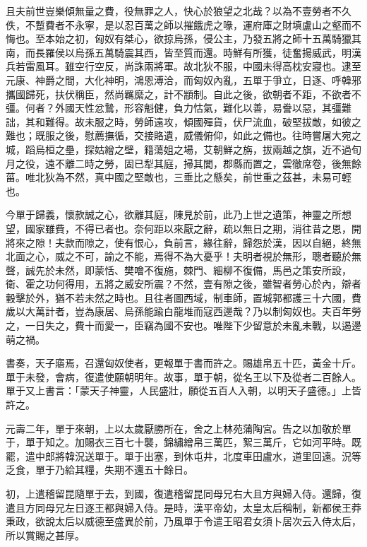 \begin{pinyinscope}
且夫前世豈樂傾無量之費，役無罪之人，快心於狼望之北哉？以為不壹勞者不久佚，不蹔費者不永寧，是以忍百萬之師以摧餓虎之喙，運府庫之財填盧山之壑而不悔也。至本始之初，匈奴有桀心，欲掠烏孫，侵公主，乃發五將之師十五萬騎獵其南，而長羅侯以烏孫五萬騎震其西，皆至質而還。時鮮有所獲，徒奮揚威武，明漢兵若雷風耳。雖空行空反，尚誅兩將軍。故北狄不服，中國未得高枕安寢也。逮至元康、神爵之間，大化神明，鴻恩溥洽，而匈奴內亂，五單于爭立，日逐、呼韓邪攜國歸死，扶伏稱臣，然尚羈縻之，計不顓制。自此之後，欲朝者不距，不欲者不彊。何者？外國天性忿鷙，形容魁健，負力怙氣，難化以善，易誊以惡，其彊難詘，其和難得。故未服之時，勞師遠攻，傾國殫貨，伏尸流血，破堅拔敵，如彼之難也；既服之後，慰薦撫循，交接賂遺，威儀俯仰，如此之備也。往時嘗屠大宛之城，蹈烏桓之壘，探姑繒之壁，籍蕩姐之場，艾朝鮮之旃，拔兩越之旗，近不過旬月之役，遠不離二時之勞，固已犁其庭，掃其閭，郡縣而置之，雲徹席卷，後無餘菑。唯北狄為不然，真中國之堅敵也，三垂比之懸矣，前世重之茲甚，未易可輕也。

今單于歸義，懷款誠之心，欲離其庭，陳見於前，此乃上世之遺策，神靈之所想望，國家雖費，不得已者也。奈何距以來厭之辭，疏以無日之期，消往昔之恩，開將來之隙！夫款而隙之，使有恨心，負前言，緣往辭，歸怨於漢，因以自絕，終無北面之心，威之不可，諭之不能，焉得不為大憂乎！夫明者視於無形，聰者聽於無聲，誠先於未然，即蒙恬、樊噲不復施，棘門、細柳不復備，馬邑之策安所設，衛、霍之功何得用，五將之威安所震？不然，壹有隙之後，雖智者勞心於內，辯者轂擊於外，猶不若未然之時也。且往者圖西域，制車師，置城郭都護三十六國，費歲以大萬計者，豈為康居、烏孫能踰白龍堆而寇西邊哉？乃以制匈奴也。夫百年勞之，一日失之，費十而愛一，臣竊為國不安也。唯陛下少留意於未亂未戰，以遏邊萌之禍。

書奏，天子寤焉，召還匈奴使者，更報單于書而許之。賜雄帛五十匹，黃金十斤。單于未發，會病，復遣使願朝明年。故事，單于朝，從名王以下及從者二百餘人。單于又上書言：「蒙天子神靈，人民盛壯，願從五百人入朝，以明天子盛德。」上皆許之。

元壽二年，單于來朝，上以太歲厭勝所在，舍之上林苑蒲陶宮。告之以加敬於單于，單于知之。加賜衣三百七十襲，錦繡繒帛三萬匹，絮三萬斤，它如河平時。既罷，遣中郎將韓況送單于。單于出塞，到休屯井，北度車田盧水，道里回遠。況等乏食，單于乃給其糧，失期不還五十餘日。

初，上遣稽留昆隨單于去，到國，復遣稽留昆同母兄右大且方與婦入侍。還歸，復遣且方同母兄左日逐王都與婦入侍。是時，漢平帝幼，太皇太后稱制，新都侯王莽秉政，欲說太后以威德至盛異於前，乃風單于令遣王昭君女須卜居次云入侍太后，所以賞賜之甚厚。


\end{pinyinscope}

